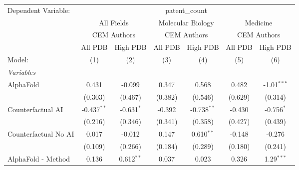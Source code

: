 \begingroup
\centering
\begin{tabular}{lcccccc}
   \tabularnewline \midrule \midrule
   Dependent Variable: & \multicolumn{6}{c}{patent\_count}\\
 & \multicolumn{2}{c}{All Fields} & \multicolumn{2}{c}{Molecular Biology} & \multicolumn{2}{c}{Medicine} \\
\cmidrule(lr){2-3} \cmidrule(lr){4-5} \cmidrule(lr){6-7}
 & \multicolumn{2}{c}{CEM Authors} & \multicolumn{2}{c}{CEM Authors} & \multicolumn{2}{c}{CEM Authors} \\
\cmidrule(lr){2-3} \cmidrule(lr){4-5} \cmidrule(lr){6-7}
 & \multicolumn{1}{c}{All PDB} & \multicolumn{1}{c}{High PDB} & \multicolumn{1}{c}{All PDB} & \multicolumn{1}{c}{High PDB} & \multicolumn{1}{c}{All PDB} & \multicolumn{1}{c}{High PDB} \\
\cmidrule(lr){2-2} \cmidrule(lr){3-3} \cmidrule(lr){4-4} \cmidrule(lr){5-5} \cmidrule(lr){6-6} \cmidrule(lr){7-7}
   Model:                                                     & (1)           & (2)           & (3)            & (4)           & (5)           & (6)\\  
   \midrule
   \emph{Variables}\\
   AlphaFold                                                  & 0.431         & -0.099        & 0.347          & 0.568         & 0.482         & -1.01$^{***}$\\   
                                                              & (0.303)       & (0.467)       & (0.382)        & (0.546)       & (0.629)       & (0.314)\\   
   Counterfactual AI                                          & -0.437$^{**}$ & -0.631$^{*}$  & -0.392         & -0.738$^{**}$ & -0.430        & -0.756$^{*}$\\   
                                                              & (0.216)       & (0.346)       & (0.341)        & (0.358)       & (0.427)       & (0.439)\\   
   Counterfactual No AI                                       & 0.017         & -0.012        & 0.147          & 0.610$^{**}$  & -0.148        & -0.276\\   
                                                              & (0.109)       & (0.266)       & (0.184)        & (0.289)       & (0.180)       & (0.241)\\   
   AlphaFold - Method                                         & 0.136         & 0.612$^{**}$  & 0.037          & 0.023         & 0.326         & 1.29$^{***}$\\   

\end{tabular}
